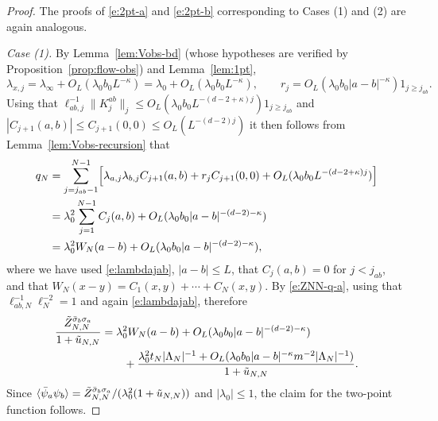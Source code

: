 \documentclass[11pt]{amsart}
\numberwithin{equation}{section}
\numberwithin{theorem}{section}
\newcommand{\1}{{\bf 1}}
\newcommand{\ellabj}{\ell_{ab,j}}
\newcommand{\ellabN}{\ell_{ab,N}}
\newcommand{\OL}{O_L}
\begin{document}
\begin{proof}
  The proofs of \eqref{e:2pt-a} and \eqref{e:2pt-b} corresponding to Cases (1) and (2)
  are again analogous. 

  \smallskip\noindent\emph{Case (1).}
  By Lemma~\ref{lem:Vobs-bd} (whose hypotheses are verified by Proposition~\ref{prop:flow-obs}) and
  Lemma~\ref{lem:1pt},
  \begin{equation} \label{e:lambdajab}
    \lambda_{x,j}
    = \lambda_\infty + \OL( \lambda_0b_0 L^{-\kappa}) 
    = \lambda_0 + \OL( \lambda_0b_0 L^{-\kappa}), 
    \qquad
    r_j=\OL(\lambda_0b_0 |a-b|^{-\kappa})
    1_{j\geq j_{ab}}.
  \end{equation}
  Using that $\ellabj^{-1}\|K^{ab}_j\|_j \leq
  \OL(\lambda_0b_0L^{-(d-2+\kappa)j})1_{j\geq j_{ab}}$ and $|C_{j+1}(a,b)| \leq C_{j+1}(0,0) \leq \OL(L^{-(d-2)j})$ it then follows
  from Lemma~\ref{lem:Vobs-recursion} that
  \begin{align}
    q_{N}
    &= \sum_{j=j_{ab}-1}^{N-1} \qB{ \lambda_{a,j}\lambda_{b,j} C_{j+1}(a,b) + r_j C_{j+1}(0,0) + \OL(\lambda_0 b_0 L^{-(d-2+\kappa)j}) }
      \nnb
    &= \lambda_0^2 \sum_{j=1}^{N-1} C_j(a,b) 
      + \OL(\lambda_0 b_0 |a-b|^{-(d-2)-\kappa})
      \nnb
    &= \lambda_0^2 W_N(a-b)  + \OL(\lambda_0 b_0 |a-b|^{-(d-2)-\kappa})
      ,
  \end{align}
  where we have used
  \eqref{e:lambdajab},
  $|a-b|\leq L$, that $C_j(a,b)=0$ for $j<j_{ab}$,
  and that $W_N(x-y)=C_1(x,y) + \cdots + C_N(x,y)$.
  By \eqref{e:ZNN-q-a},
  using that $\ellabN^{-1}\ell_N^{-2}=1$ and again  \eqref{e:lambdajab}, therefore
  \begin{align}
    \frac{\tilde Z_{N,N}^{\bar\sigma_b\sigma_a}}{1+\tilde u_{N,N}}
    &= \lambda_0^2 W_N(a-b)+ \OL(\lambda_0b_0 |a-b|^{-(d-2)-\kappa}) 
      \nnb
    &\qquad
      + \frac{\lambda_0^2 t_N |\Lambda_N|^{-1}
      + \OL(\lambda_0b_0 |a-b|^{-\kappa} m^{-2}|\Lambda_N|^{-1})}{1+\tilde u_{N,N}}
      .
  \end{align}
  Since
  $\langle \bar\psi_a\psi_b \rangle =
  \tilde Z_{N,N}^{\bar\sigma_b\sigma_a}/(\lambda_0^2 (1+\tilde u_{N,N}))$ and
  $|\lambda_0| \leq 1$, the claim for the two-point function follows.


\end{proof}
\end{document}
